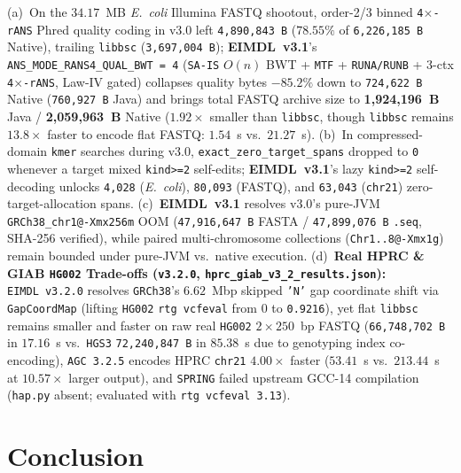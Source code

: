 \documentclass[10pt]{article}
\theoremstyle{definition}
\begin{document}
\begin{enumerate}
  (a)~On the $34.17$~MB \textit{E.~coli} Illumina FASTQ shootout, order-2/3 binned \texttt{4$\times$-rANS} Phred quality coding in v3.0 left \texttt{4,890,843~B} ($78.55\%$ of \texttt{6,226,185~B} Native), trailing \texttt{libbsc} (\texttt{3,697,004~B}); \textbf{EIMDL~v3.1}'s \texttt{ANS\_MODE\_RANS4\_QUAL\_BWT = 4} (\texttt{SA-IS} $O(n)$ BWT + \texttt{MTF} + \texttt{RUNA/RUNB} + 3-ctx \texttt{4$\times$-rANS}, Law-IV gated) collapses quality bytes $-85.2\%$ down to \texttt{724,622~B} Native (\texttt{760,927~B} Java) and brings total FASTQ archive size to \textbf{1,924,196~B} Java / \textbf{2,059,963~B} Native ($1.92\times$ smaller than \texttt{libbsc}, though \texttt{libbsc} remains $13.8\times$ faster to encode flat FASTQ: $1.54$~s vs.\ $21.27$~s).
  (b)~In compressed-domain \texttt{kmer} searches during v3.0, \texttt{exact\_zero\_target\_spans} dropped to \texttt{0} whenever a target mixed \texttt{kind>=2} self-edits; \textbf{EIMDL~v3.1}'s lazy \texttt{kind>=2} self-decoding unlocks \texttt{4,028} (\textit{E.~coli}), \texttt{80,093} (FASTQ), and \texttt{63,043} (\texttt{chr21}) zero-target-allocation spans.
  (c)~\textbf{EIMDL~v3.1} resolves v3.0's pure-JVM \texttt{GRCh38\_chr1@-Xmx256m} OOM (\texttt{47,916,647~B} FASTA / \texttt{47,899,076~B} \texttt{.seq}, SHA-256 verified), while paired multi-chromosome collections (\texttt{Chr1..8@-Xmx1g}) remain bounded under pure-JVM vs.\ native execution.
  (d)~\textbf{Real HPRC \& GIAB \texttt{HG002} Trade-offs (\texttt{v3.2.0}, \texttt{hprc\_giab\_v3\_2\_results.json}):} \texttt{EIMDL~v3.2.0} resolves \texttt{GRCh38}'s $6.62$~Mbp skipped \texttt{'N'} gap coordinate shift via \texttt{GapCoordMap} (lifting \texttt{HG002} \texttt{rtg vcfeval} from $0$ to \texttt{0.9216}), yet flat \texttt{libbsc} remains smaller and faster on raw real \texttt{HG002} $2\times 250$~bp FASTQ (\texttt{66,748,702~B} in $17.16$~s vs.\ \texttt{HGS3} \texttt{72,240,847~B} in $85.38$~s due to genotyping index co-encoding), \texttt{AGC~3.2.5} encodes HPRC \texttt{chr21} $4.00\times$ faster ($53.41$~s vs.\ $213.44$~s at $10.57\times$ larger output), and \texttt{SPRING} failed upstream GCC-14 compilation (\texttt{hap.py} absent; evaluated with \texttt{rtg vcfeval~3.13}).
\end{enumerate}

\section{Conclusion}
\end{document}
